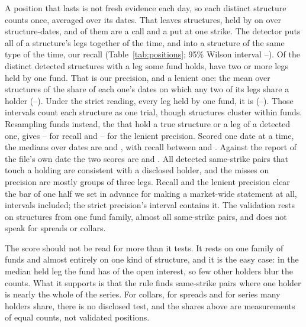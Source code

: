\documentclass[11pt]{article}
\begin{document}
A position that lasts is not fresh evidence each day, so each distinct structure counts once,
averaged over its dates. That leaves \PosTruth{} structures, held by \PosFunds{} on
\PosUnderlyings{} over \PosStructureDates{} structure-dates, and \PosSyntheticTruth{} of them
are a call and a put at one strike. The detector puts all of a structure's legs together
\PosGrouped{} of the time, and into a structure of the same type \PosRecall{} of the time, our
recall (Table~\ref{tab:positions}; 95\% Wilson interval \PosRecallLow{}--\PosRecallHigh{}). Of the \PosTouching{} distinct detected structures with a
leg some fund holds, \PosPrecision{} have two or more legs held by one fund. That is our
precision, and a lenient one: the mean over structures of the share of each one's dates on
which any two of its legs share a holder (\PosPrecisionLow{}--\PosPrecisionHigh{}). Under the
strict reading, every leg held by one fund, it is \PosPrecisionExact{}
(\PosPrecisionExactLow{}--\PosPrecisionExactHigh{}). Those intervals count each structure
as one trial, though structures cluster within funds. Resampling funds instead, the
\PosBootFunds{} that hold a true structure or a leg of a detected one, gives \PosRecallFundLow{}--\PosRecallFundHigh{} for recall and
\PosPrecisionFundLow{}--\PosPrecisionFundHigh{} for the lenient precision. Scored one date at a time, the medians
over \PosScoreDates{} dates are \PosMedianRecall{} and \PosMedianPrecision{}, with recall
between \PosLowRecall{} and \PosHighRecall{}. Against the report of the file's own date the
two scores are \PosSameDayRecall{} and \PosSameDayPrecision{}. All \PosSyntheticTouching{}
detected same-strike pairs that touch a holding are consistent with a disclosed holder, and the misses on precision are
mostly groups of three legs. Recall and the lenient precision clear the bar of one half we
set in advance for making a market-wide statement at all, intervals included; the strict
precision's interval contains it. The validation rests on \PosTruth{} structures from one
fund family, almost all same-strike pairs, and does not speak for spreads or collars.



The score should not be read for more than it tests. It rests on one family of funds and
almost entirely on one kind of structure, and it is the easy case: in the median held leg the
fund has \PosHolderShare{} of the open interest, so few other holders blur the counts. What
it supports is that the rule finds same-strike pairs where one holder is nearly the whole of
the series. For collars, for spreads and for series many holders share, there is no disclosed
test, and the shares above are measurements of equal counts, not validated positions.
\end{document}
